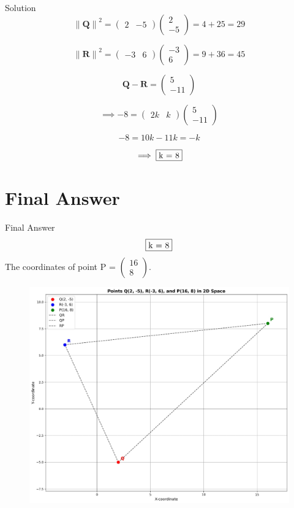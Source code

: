 \documentclass{beamer}
\let\vec\mathbf
\theoremstyle{remark}
\providecommand{\norm}[1]{\lVert#1\rVert}
\newcommand{\myvec}[1]{\ensuremath{\begin{pmatrix}#1\end{pmatrix}}}
\begin{document}
\begin{frame}{Solution}
\begin{equation}
    {\norm{\vec{Q}}}^2 = \myvec{2&-5}\myvec{2\\-5} = 4+25 = 29
\end{equation}

\begin{equation}
    {\norm{\vec{R}}}^2 = \myvec{-3&6}\myvec{-3\\6} = 9+36 = 45
\end{equation}

\begin{equation}
    \vec{Q} - \vec{R} = \myvec{5\\-11}
\end{equation}

\begin{equation}
    \implies -8 = \myvec{2k&k}\myvec{5\\-11}
\end{equation}

\begin{equation}
    -8 = 10k - 11k = -k
\end{equation}

\begin{equation}
    \implies \fbox{k = 8}
\end{equation}

\end{frame}

\section{Final Answer}
\begin{frame}{Final Answer}
\begin{equation*}
    \fbox{k = 8}
\end{equation*}
	The coordinates of point P = $\myvec{16\\8}$.

\begin{figure}
    \centering
    \includegraphics[width=0.5\linewidth]{figs/1.jpg}
\end{figure}

\end{frame}
\end{document}

